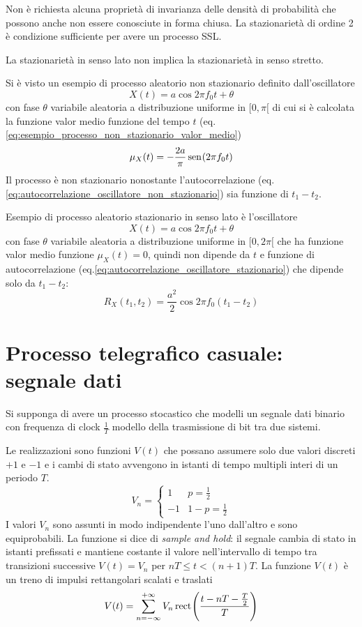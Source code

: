 Non è richiesta alcuna proprietà di invarianza delle densità di probabilità che possono anche non essere conosciute in forma chiusa. 
La stazionarietà di ordine 2 è condizione sufficiente per avere un processo SSL.

La stazionarietà in senso lato non implica la stazionarietà in senso stretto.

\begin{esempio}
Si è visto un esempio di processo aleatorio non stazionario definito dall'oscillatore 
\[X(t)=a\cos{2\pi f_0 t+\theta}\]
con fase $\theta$ variabile aleatoria a distribuzione uniforme in $[0,\pi[$
di cui si è calcolata la funzione valor medio funzione del tempo $t$ (eq.\ref{eq:esempio_processo_non_stazionario_valor_medio})
\[\mu_X(t)=-\frac{2a}{\pi}\,{\operatorname{sen}}^{}\!\left({2\pi f_0 t}\right)\]
Il processo è non stazionario nonostante l'autocorrelazione (eq.\ref{eq:autocorrelazione_oscillatore_non_stazionario}) sia funzione di $t_1-t_2$.
\end{esempio}

\begin{esempio}\label{es:oscillatore_stazionario_senso_lato}
Esempio di processo aleatorio stazionario in senso lato è l'oscillatore 
\[X(t)=a\cos{2\pi f_0 t+\theta}\] 
con fase $\theta$ variabile aleatoria a distribuzione uniforme in $[0,2\pi[$
che ha funzione valor medio funzione $\mu_X(t)=0$, quindi non dipende da $t$ e funzione di autocorrelazione (eq.\ref{eq:autocorrelazione_oscillatore_stazionario}) che dipende solo da $t_1-t_2$:
\[R_X(t_1,t_2)=\frac{a^2}{2}\cos{2\pi f_0(t_1-t_2)}\]
\end{esempio}

\section{Processo telegrafico casuale: segnale dati}
Si supponga di avere un processo stocastico che modelli un segnale dati binario con frequenza di clock $\frac{1}{T}$ modello della trasmissione di bit tra due sistemi.

Le realizzazioni sono funzioni $V(t)$ che possano assumere solo due valori discreti $+1$ e $-1$ e i cambi di stato avvengono in istanti di tempo multipli interi di un periodo $T$.
\begin{equation}V_n=\begin{cases}
1&p=\frac{1}{2}\\-1&1-p=\frac{1}{2}
\end{cases}\end{equation}
I valori $V_n$ sono assunti in modo indipendente l'uno dall'altro e sono equiprobabili. La funzione si dice di \emph{sample and hold}: il segnale cambia di stato in istanti prefissati e mantiene costante il valore nell'intervallo di tempo tra transizioni successive $V(t)=V_n$ per $n T\leq t<(n+1)T$.
La funzione $V(t)$ è un treno di impulsi rettangolari scalati e traslati 
\begin{equation}\label{eq:segnale_dati}
V(t)=\sum_{n=-\infty}^{+\infty}{V_n\,{\operatorname{rect}}^{}\!\left({\frac{t-n T-\frac{T}{2}}{T}}\right)}
\end{equation}

